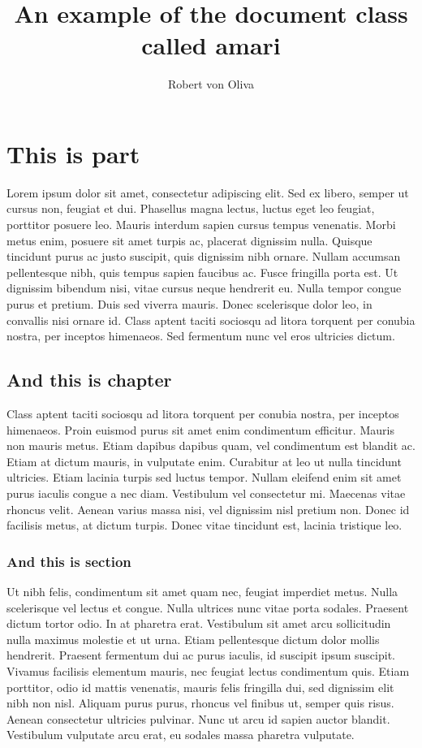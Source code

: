 \documentclass[12pt]{amari}
\author{Robert von Oliva}
\title{An example of the document class called amari}
\begin{document}
\maketitle
\fontsize{12pt}{12pt}\selectfont

\part{This is part}
Lorem ipsum dolor sit amet, consectetur adipiscing elit. Sed ex libero, semper ut cursus non, feugiat et dui. Phasellus magna lectus, luctus eget leo feugiat, porttitor posuere leo. Mauris interdum sapien cursus tempus venenatis. Morbi metus enim, posuere sit amet turpis ac, placerat dignissim nulla. Quisque tincidunt purus ac justo suscipit, quis dignissim nibh ornare. Nullam accumsan pellentesque nibh, quis tempus sapien faucibus ac. Fusce fringilla porta est. Ut dignissim bibendum nisi, vitae cursus neque hendrerit eu. Nulla tempor congue purus et pretium. Duis sed viverra mauris. Donec scelerisque dolor leo, in convallis nisi ornare id. Class aptent taciti sociosqu ad litora torquent per conubia nostra, per inceptos himenaeos. Sed fermentum nunc vel eros ultricies dictum.

\chapter{And this is chapter}
Class aptent taciti sociosqu ad litora torquent per conubia nostra, per inceptos himenaeos. Proin euismod purus sit amet enim condimentum efficitur. Mauris non mauris metus. Etiam dapibus dapibus quam, vel condimentum est blandit ac. Etiam at dictum mauris, in vulputate enim. Curabitur at leo ut nulla tincidunt ultricies. Etiam lacinia turpis sed luctus tempor. Nullam eleifend enim sit amet purus iaculis congue a nec diam. Vestibulum vel consectetur mi. Maecenas vitae rhoncus velit. Aenean varius massa nisi, vel dignissim nisl pretium non. Donec id facilisis metus, at dictum turpis. Donec vitae tincidunt est, lacinia tristique leo. 

\section{And this is section}
Ut nibh felis, condimentum sit amet quam nec, feugiat imperdiet metus. Nulla scelerisque vel lectus et congue. Nulla ultrices nunc vitae porta sodales. Praesent dictum tortor odio. In at pharetra erat. Vestibulum sit amet arcu sollicitudin nulla maximus molestie et ut urna. Etiam pellentesque dictum dolor mollis hendrerit. Praesent fermentum dui ac purus iaculis, id suscipit ipsum suscipit. Vivamus facilisis elementum mauris, nec feugiat lectus condimentum quis. Etiam porttitor, odio id mattis venenatis, mauris felis fringilla dui, sed dignissim elit nibh non nisl. Aliquam purus purus, rhoncus vel finibus ut, semper quis risus. Aenean consectetur ultricies pulvinar. Nunc ut arcu id sapien auctor blandit. Vestibulum vulputate arcu erat, eu sodales massa pharetra vulputate. 
\end{document}
